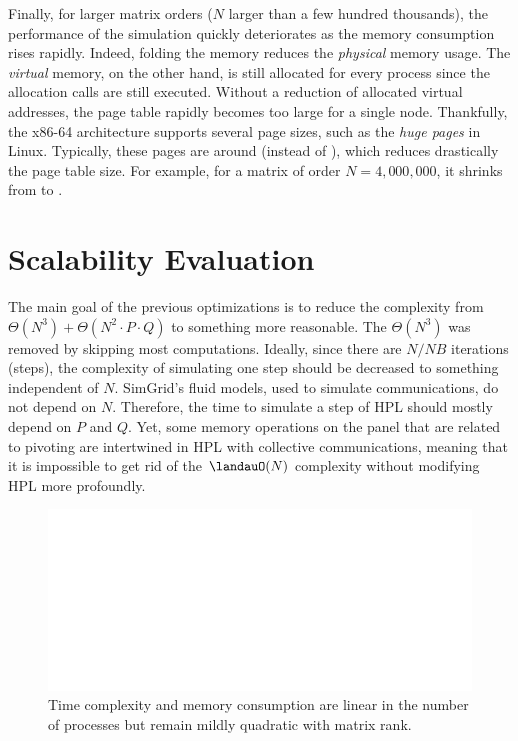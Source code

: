         Finally, for larger matrix orders (\ie \(N\) larger than a few hundred thousands), the performance of the
        simulation quickly deteriorates as the memory consumption rises rapidly. Indeed, folding the memory reduces the
        \emph{physical} memory usage. The \emph{virtual} memory, on the other hand, is still allocated for every process
        since the allocation calls are still executed.  Without a reduction of allocated virtual addresses, the page
        table rapidly becomes too large for a single node. Thankfully, the x86-64 architecture supports several page
        sizes, such as the \emph{huge pages} in Linux. Typically, these pages are around  (instead of
        ), which reduces drastically the page table size. For example, for a matrix of order
        \(N=4,000,000\), it shrinks from  to .

    \section{Scalability Evaluation}
        The main goal of the previous optimizations is to reduce the complexity from \(\Theta(N^3) +
        \Theta(N^2\cdot{}P\cdot{}Q)\) to something more reasonable.  The \(\Theta(N^3)\) was removed by skipping most
        computations.  Ideally, since there are \(N/NB\) iterations (steps), the complexity of simulating one step
        should be decreased to something independent of \(N\). SimGrid's fluid models, used to simulate communications,
        do not depend on \(N\). Therefore, the time to simulate a step of HPL should mostly depend on \(P\) and \(Q\).
        Yet, some memory operations on the panel that are related to pivoting are intertwined in HPL with collective
        communications, meaning that it is impossible to get rid of the \(\landauO(N)\) complexity without modifying HPL more
        profoundly.

        \begin{figure}[htpb]
            \centering
            \includegraphics[width=\linewidth,page=2]{./img/prediction/emulating/scalability_plot_size.pdf}
            \caption{Time complexity and memory consumption are linear in the number of processes but remain mildly
            quadratic with matrix rank.}
            \label{fig:hpl_scalability}
        \end{figure}

